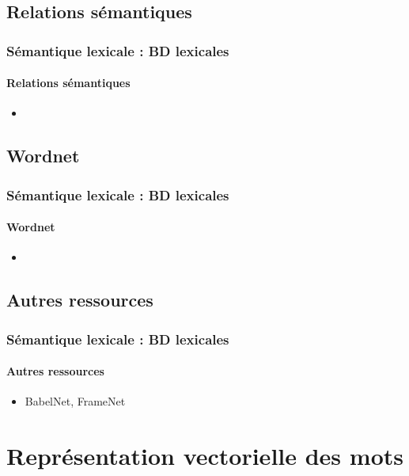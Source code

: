 \documentclass[xcolor=table]{beamer}
\begin{document}
\subsection{Relations sémantiques}

\begin{frame}
	\frametitle{Sémantique lexicale : BD lexicales}
	\framesubtitle{Relations sémantiques}
	
	\begin{itemize}
		\item 
	\end{itemize}
	
\end{frame}

\subsection{Wordnet}

\begin{frame}
	\frametitle{Sémantique lexicale : BD lexicales}
	\framesubtitle{Wordnet}
	
	\begin{itemize}
		\item 
	\end{itemize}
	
\end{frame}

\subsection{Autres ressources}

\begin{frame}
	\frametitle{Sémantique lexicale : BD lexicales}
	\framesubtitle{Autres ressources}
	
	\begin{itemize}
		\item BabelNet, FrameNet
	\end{itemize}
	
\end{frame}

\section{Représentation vectorielle des mots}
\end{document}
